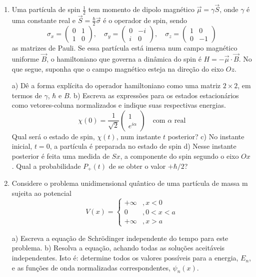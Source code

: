 \begin{enumerate}[start=1,label={\bfseries Q\arabic*.}]
\item Uma partícula de spin $\frac{1}{2}$ tem momento de dipolo magnético $\vec{\mu} = \gamma \vec{S}$, onde $\gamma$ é uma constante real e $\vec{S} = \frac{\hbar}{2} \vec{\sigma}$ é o operador de spin, sendo
$$
\sigma_{x}=\left(\begin{array}{ll}
0 & 1 \\
1 & 0
\end{array}\right), \quad \sigma_{y}=\left(\begin{array}{cc}
0 & -i \\
i & 0
\end{array}\right), \quad \sigma_{z}=\left(\begin{array}{cc}
1 & 0 \\
0 & -1
\end{array}\right)
$$
as matrizes de Pauli. Se essa partícula está imersa num campo magnético uniforme $\vec{B}$, o hamiltoniano que governa a dinâmica do spin é $H = - \vec{\mu} \cdot \vec{B}$. No que segue, suponha que o campo magnético esteja na direção do eixo $Oz$.

a) Dê a forma explícita do operador hamiltoniano como uma matriz $2 \times 2$, em termos de $\gamma$, $\hbar$ e $B$.
b) Escreva as expressões para os estados estacionários como vetores-coluna normalizados e indique suas respectivas energias.
$$
\chi(0)=\frac{1}{\sqrt{2}}\left(\begin{array}{l}
1 \\
e^{i \alpha}
\end{array}\right) \quad \mbox{com $\alpha$ real}
$$
Qual será o estado de spin, $\chi (t)$, num instante $t$ posterior?
c) No instante inicial, $t = 0$, a partícula é preparada no estado de spin
d) Nesse instante posterior é feita uma medida de $Sx$, a componente do spin segundo o eixo $Ox$. Qual a probabilidade $P_{+}(t) $ de se obter o valor $+ \hbar / 2$?




\item Considere o problema unidimensional quântico de uma partícula de massa m sujeita ao
potencial
$$
V(x)=\left\{\begin{array}{cc}
+\infty & , x<0 \\
0 & , 0<x<a \\
+\infty & , x>a
\end{array}\right.
$$

a) Escreva a equação de Schrödinger independente do tempo para este problema.
b) Resolva a equação, achando todas as soluções aceitáveis independentes. Isto é: determine todos os valores possíveis para a energia, $E_{n}$, e as funções de onda normalizadas correspondentes, $\psi_{n}(x)$.


\end{enumerate}
